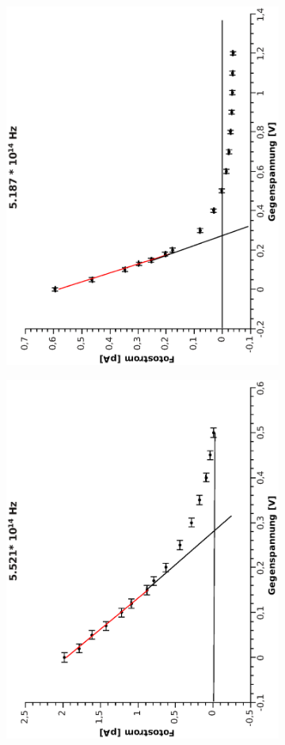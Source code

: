\documentclass[12pt,a4paper,twopage]{article}
\begin{document}
\begin{figure}
\centering
\begin{subfigure}{0.48\linewidth}
\includegraphics[width=0.75\linewidth, angle=-90]{5187.eps}
\end{subfigure}
\begin{subfigure}{0.48\linewidth}
\includegraphics[width=0.75\linewidth, angle=-90]{5521.eps}

\end{subfigure}
\end{figure}
\end{document}
